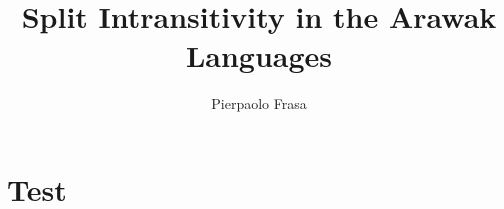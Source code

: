 \documentclass[a4paper]{scrreprt}
\author{Pierpaolo Frasa}
\title{Split Intransitivity in the Arawak Languages}
\begin{document}
\pagestyle{empty}
\begin{titlepage}
\titleMS
\end{titlepage}

\setcounter{page}{1}
\tableofcontents


\chapter{Test}

\end{document}
